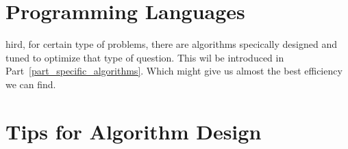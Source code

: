 \documentclass[../main.tex]{subfiles}
\begin{document}
\section{Programming Languages}
\label{sec_programming_languages}
 



hird, for certain type of problems, there are algorithms specically designed and tuned to optimize that type of question. This wil be introduced in Part~\ref{part_specific_algorithms}. Which might give us almost the best efficiency we can find.



\section{Tips for Algorithm Design}
\end{document}
